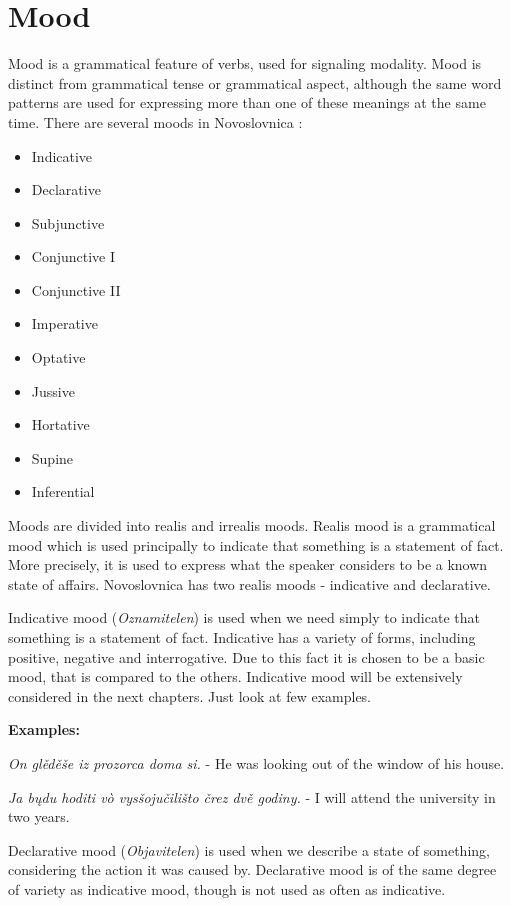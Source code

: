 \section{Mood}


Mood is a grammatical feature of verbs, used for signaling modality. Mood is distinct from grammatical tense or grammatical aspect, although the same word patterns are used for expressing more than one of these meanings at the same time. There are several moods in Novoslovnica \cite{nsl-naklony}:

\begin{itemize}
	\item Indicative
	\item Declarative
	\item Subjunctive
	\item Conjunctive I
	\item Conjunctive II
	\item Imperative
	\item Optative
	\item Jussive
	\item Hortative
	\item Supine
	\item Inferential
\end{itemize}

Moods are divided into realis and irrealis moods. Realis mood is a grammatical mood which is used principally to indicate that something is a statement of fact. More precisely, it is used to express what the speaker considers to be a known state of affairs. Novoslovnica has two realis moods - indicative and declarative.

Indicative mood (\textit{Oznamitelen})  is used when we need simply to indicate that something is a statement of fact. Indicative has a variety of forms, including positive, negative and interrogative. Due to this fact it is chosen to be a basic mood, that is compared to the others. Indicative mood will be extensively considered in the next chapters. Just look at few examples.

\textbf{Examples:}

\textit{On glěděše iz prozorca doma si.} - He was looking out of the window of his house.

\textit{Ja bųdu hoditi vò vysšojučilišto črez dvě godiny.} - I will attend the university in two years.

Declarative mood (\textit{Objavitelen}) is used when we describe a state of something, considering the action it was caused by. Declarative mood is of the same degree of variety as indicative mood, though is not used as often as indicative.


